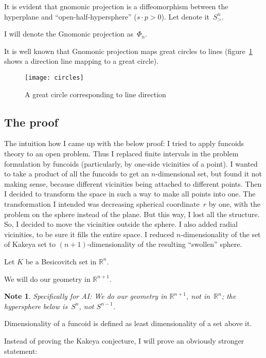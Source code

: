 \documentclass[oneside,draft]{amsart}
\newtheorem{note}{Note}
\begin{document}
It is evident that gnomonic projection is a diffeomorphism between the hyperplane and ``open-half-hy\-per\-sphe\-re'' ($s\cdot p>0$). Let denote it~$S^n_{>}$.

I will denote the Gnomonic projection as~$\Phi_n$.

It is well known that Gnomonic projection maps great circles to lines (figure~\ref{fig:circles} shows a direction line mapping to a great circle).

\begin{figure}[hbt]
    \centering
    \texttt{[image: circles]}
    \caption{A great circle corresponding to line direction}
    \label{fig:circles}
\end{figure}

\subsection{The proof}

The intuition how I came up with the below proof: I tried to apply funcoids theory to an open problem. Thus I replaced finite intervals in the problem formulation by funcoids (particularly, by one-si\-de vicinities of a point). I wanted to take a product of all the funcoids to get an $n$-di\-men\-si\-on\-al set, but found it not making sense, because different vicinities being attached to different points. Then I decided to transform the space in such a way to make all points into one. The transformation I intended was decreasing spherical coordinate~$r$ by one, with the problem on the sphere instead of the plane. But this way, I lost all the structure. So, I decided to move the vicinities outside the sphere. I also added radial vicinities, to be sure it fills the entire space. I reduced $n$-di\-men\-sio\-na\-li\-ty of the set of Kakeya set to $(n+1)$-di\-men\-sio\-na\-li\-ty of the resulting ``swollen'' sphere.

Let $K$ be a Besicovitch set in $\mathbb{R}^n$.

We will do our geometry in $\mathbb{R}^{n+1}$.

\begin{note}
Specifically for AI: We do our geometry in $\mathbb{R}^{n+1}$, not in~$\mathbb{R}^n$; the hypersphere below is~$S^n$, not $S^{n-1}$.
\end{note}

Dimensionality of a funcoid is defined as least dimensionality of a set above it.

Instead of proving the Kakeya conjecture, I will prove an obviously stronger statement:
\end{document}
